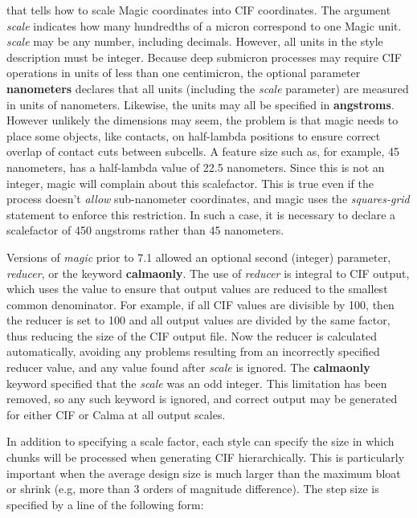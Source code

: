 \documentclass[letterpaper,twoside,12pt]{article}
\begin{document}
that tells how to scale Magic coordinates into CIF coordinates.
The argument {\itshape scale} indicates how many hundredths of a
micron correspond to one Magic unit.  {\itshape scale} may be any
number, including decimals.  However, all units in the style description
must be integer.  Because deep submicron processes may require CIF
operations in units of less than one centimicron, the optional parameter
{\bfseries nanometers} declares that all units (including the {\itshape
scale} parameter) are measured in units of nanometers.  Likewise, the
units may all be specified in {\bfseries angstroms}.  However unlikely
the dimensions may seem, the problem is that magic needs to place some
objects, like contacts, on half-lambda positions to ensure correct
overlap of contact cuts between subcells.  A feature size such as,
for example, 45 nanometers, has a half-lambda value of 22.5 nanometers.
Since this is not an integer, magic will complain about this scalefactor.
This is true even if the process doesn't {\itshape allow} sub-nanometer
coordinates, and magic uses the {\itshape squares-grid} statement to
enforce this restriction.  In such a case, it is necessary to declare
a scalefactor of 450 angstroms rather than 45 nanometers.

Versions of {\itshape magic} prior to 7.1 allowed an optional second
(integer) parameter, {\itshape reducer}, or the keyword {\bfseries calmaonly}.
The use of {\itshape reducer} is integral to CIF output, which uses the value
to ensure that output values are reduced to the smallest common denominator.
For example, if all CIF values are divisible by 100, then the reducer is set
to 100 and all output values are divided by the same factor, thus reducing
the size of the CIF output file.  Now the reducer is calculated automatically,
avoiding any problems resulting from an incorrectly specified reducer value,
and any value found after {\itshape scale} is ignored.
The {\bfseries calmaonly} keyword specified that the {\itshape scale} was
an odd integer.  This limitation has been removed, so any such keyword is
ignored, and correct output may be generated for either CIF or Calma at all
output scales.

In addition to specifying a scale factor, each style can specify
the size in which chunks will be processed when generating CIF
hierarchically.  This is particularly important when the average
design size is much larger than the maximum bloat or shrink (e.g,
more than 3 orders of magnitude difference).
The step size is specified by a line of the following form:
\end{document}

